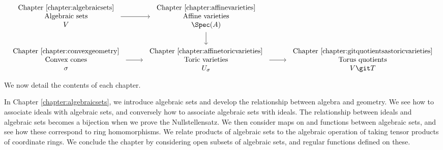 \documentclass[12pt]{amsart}
\theoremstyle{plain}
\theoremstyle{definition}
\begin{document}
\[\begin{tikzcd}
	\begin{array}{c} \text{Chapter \ref{chapter:algebraicsets}} \\ \text{Algebraic sets} \\ V \end{array} & \begin{array}{c} \text{Chapter \ref{chapter:affinevarieties}} \\ \text{Affine varieties} \\ \Spec(A) \end{array} \\
	\begin{array}{c} \text{Chapter \ref{chapter:convexgeometry}} \\ \text{Convex cones} \\ \sigma \end{array} & \begin{array}{c} \text{Chapter \ref{chapter:affinetoricvarieties}} \\ \text{Toric varieties} \\ U_\sigma \end{array} & \begin{array}{c} \text{Chapter \ref{chapter:gitquotientsastoricvarieties}} \\ \text{Torus quotients} \\ V \git T \end{array}
	\arrow[from=1-1, to=1-2]
	\arrow[from=1-2, to=2-2]
	\arrow[from=2-1, to=2-2]
	\arrow[from=2-2, to=2-3]
\end{tikzcd}\]
\noindent
We now detail the contents of each chapter.

In Chapter \ref{chapter:algebraicsets}, we introduce algebraic sets and develop the relationship between algebra and geometry.
We see how to associate ideals with algebraic sets, and conversely how to associate algebraic sets with ideals.
The relationship between ideals and algebraic sets becomes a bijection when we prove the Nullstellensatz.
We then consider maps on and functions between algebraic sets, and see how these correspond to ring homomorphisms.
We relate products of algebraic sets to the algebraic operation of taking tensor products of coordinate rings.
We conclude the chapter by considering open subsets of algebraic sets, and regular functions defined on these.
\end{document}
